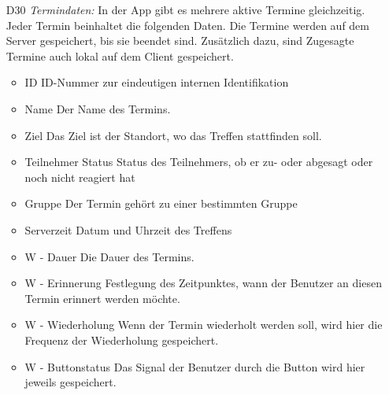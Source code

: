 \documentclass{scrartcl}
\begin{document}
\begin{itemize}
		\newpage
		\item [D30] \textit{Termindaten:}
		In der App gibt es mehrere aktive Termine gleichzeitig. Jeder Termin beinhaltet die folgenden Daten.
		Die Termine werden auf dem Server gespeichert, bis sie beendet sind. Zusätzlich dazu, sind Zugesagte Termine auch lokal auf dem Client gespeichert.
		\begin{itemize}
			\item ID
			\newline ID-Nummer zur eindeutigen internen Identifikation
			\item Name
			\newline Der Name des Termins.
			\item Ziel
			\newline Das Ziel ist der Standort, wo das Treffen stattfinden soll.
			\item \gls{Teilnehmer} Status
			\newline Status des Teilnehmers, ob er zu- oder abgesagt oder noch nicht reagiert hat
			\item Gruppe
			\newline Der Termin gehört zu einer bestimmten Gruppe
			\item Serverzeit
			\newline Datum und Uhrzeit des Treffens
			\item W - Dauer
			\newline Die Dauer des Termins.
			\item W - Erinnerung
			\newline Festlegung des Zeitpunktes, wann der Benutzer an diesen Termin erinnert werden möchte.
			\item W - Wiederholung
			\newline Wenn der Termin wiederholt werden soll, wird hier die Frequenz der Wiederholung gespeichert.
			\item W - Buttonstatus 
			\newline Das Signal der Benutzer durch die Button wird hier jeweils gespeichert.
		\end{itemize}
	\end{itemize}
	
	\newpage
	
	
\end{document}
